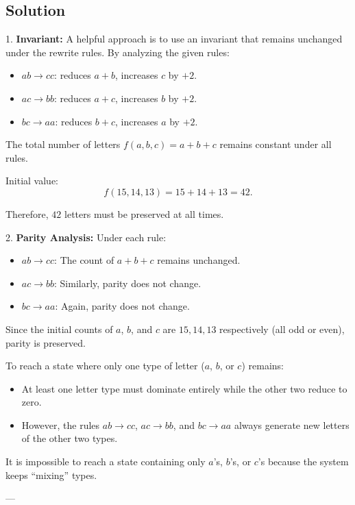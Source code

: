 \documentclass{article}
\theoremstyle{theorem}
\theoremstyle{definition}
\theoremstyle{remark}
\begin{document}
\subsection*{Solution}

1. \textbf{Invariant:}  
   A helpful approach is to use an invariant that remains unchanged under the rewrite rules. By analyzing the given rules:  
   \begin{itemize}
       \item \( ab \to cc \): reduces \( a + b \), increases \( c \) by \( +2 \).
       \item \( ac \to bb \): reduces \( a + c \), increases \( b \) by \( +2 \).
       \item \( bc \to aa \): reduces \( b + c \), increases \( a \) by \( +2 \).
   \end{itemize}
   The total number of letters \( f(a, b, c) = a + b + c \) remains constant under all rules.

   Initial value:
   \[
   f(15, 14, 13) = 15 + 14 + 13 = 42.
   \]

   Therefore, \( 42 \) letters must be preserved at all times.

2. \textbf{Parity Analysis:}  
   Under each rule:
   \begin{itemize}
       \item \( ab \to cc \): The count of \( a + b + c \) remains unchanged.
       \item \( ac \to bb \): Similarly, parity does not change.
       \item \( bc \to aa \): Again, parity does not change.
   \end{itemize}

   Since the initial counts of \( a \), \( b \), and \( c \) are \( 15, 14, 13 \) respectively (all odd or even), parity is preserved.

To reach a state where only one type of letter (\( a \), \( b \), or \( c \)) remains:
\begin{itemize}
    \item At least one letter type must dominate entirely while the other two reduce to zero.
    \item However, the rules \( ab \to cc \), \( ac \to bb \), and \( bc \to aa \) always generate new letters of the other two types.
\end{itemize}
It is impossible to reach a state containing only \( a \)'s, \( b \)'s, or \( c \)'s because the system keeps ``mixing'' types.

---
\end{document}

